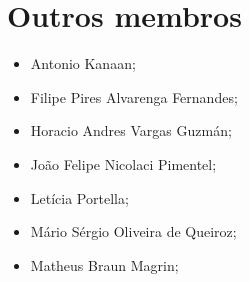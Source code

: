 \documentclass[a4paper,twocolumn,openright,article,12pt]{memoir}
\begin{document}
\section*{Outros membros}

\begin{itemize}
\item Antonio Kanaan;
\item Filipe Pires Alvarenga Fernandes;
\item Horacio Andres Vargas Guzmán;
\item João Felipe Nicolaci Pimentel;
\item Letícia Portella;
\item Mário Sérgio Oliveira de Queiroz;
\item Matheus Braun Magrin;
\end{itemize}
\end{document}
